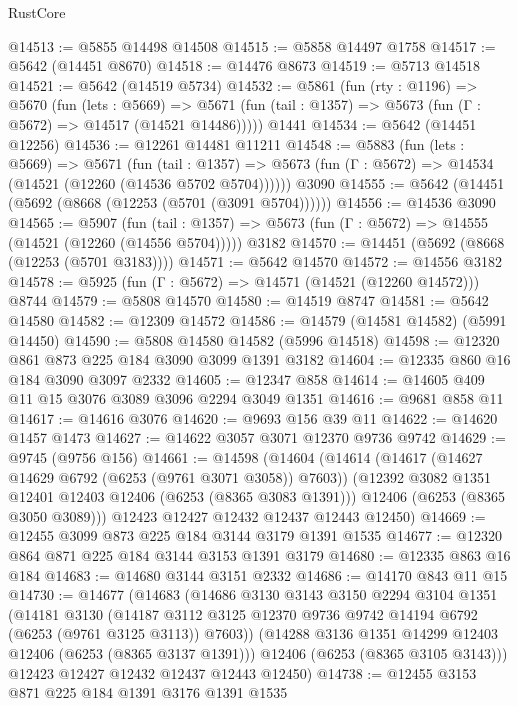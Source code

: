 \begin{lexlean}{RustCore}
\begin{coremodule}
@14513 := @5855 @14498 @14508
@14515 := @5858 @14497 @1758
@14517 := @5642 (@14451 @8670)
@14518 := @14476 @8673
@14519 := @5713 @14518
@14521 := @5642 (@14519 @5734)
@14532 := @5861
    (fun (rty : @1196) =>
    @5670
      (fun (lets : @5669) =>
      @5671 (fun (tail : @1357) => @5673 (fun (Γ : @5672) => @14517 (@14521 @14486)))))
    @1441
@14534 := @5642 (@14451 @12256)
@14536 := @12261 @14481 @11211
@14548 := @5883
    (fun (lets : @5669) =>
    @5671
      (fun (tail : @1357) =>
      @5673 (fun (Γ : @5672) => @14534 (@14521 (@12260 (@14536 @5702 @5704))))))
    @3090
@14555 := @5642 (@14451 (@5692 (@8668 (@12253 (@5701 (@3091 @5704))))))
@14556 := @14536 @3090
@14565 := @5907
    (fun (tail : @1357) => @5673 (fun (Γ : @5672) => @14555 (@14521 (@12260 (@14556 @5704)))))
    @3182
@14570 := @14451 (@5692 (@8668 (@12253 (@5701 @3183))))
@14571 := @5642 @14570
@14572 := @14556 @3182
@14578 := @5925 (fun (Γ : @5672) => @14571 (@14521 (@12260 @14572))) @8744
@14579 := @5808 @14570
@14580 := @14519 @8747
@14581 := @5642 @14580
@14582 := @12309 @14572
@14586 := @14579 (@14581 @14582) (@5991 @14450)
@14590 := @5808 @14580 @14582 (@5996 @14518)
@14598 := @12320 @861 @873 @225 @184 @3090 @3099 @1391 @3182
@14604 := @12335 @860 @16 @184 @3090 @3097 @2332
@14605 := @12347 @858
@14614 := @14605 @409 @11 @15 @3076 @3089 @3096 @2294 @3049 @1351
@14616 := @9681 @858 @11
@14617 := @14616 @3076
@14620 := @9693 @156 @39 @11
@14622 := @14620 @1457 @1473
@14627 := @14622 @3057 @3071 @12370 @9736 @9742
@14629 := @9745 (@9756 @156)
@14661 := @14598
    (@14604
      (@14614
        (@14617 (@14627 @14629 @6792 (@6253 (@9761 @3071 @3058)) @7603))
        (@12392 @3082 @1351 @12401 @12403 @12406 (@6253 (@8365 @3083 @1391)))
        @12406
        (@6253 (@8365 @3050 @3089)))
      @12423
      @12427
      @12432
      @12437
      @12443
      @12450)
@14669 := @12455 @3099 @873 @225 @184 @3144 @3179 @1391 @1535
@14677 := @12320 @864 @871 @225 @184 @3144 @3153 @1391 @3179
@14680 := @12335 @863 @16 @184
@14683 := @14680 @3144 @3151 @2332
@14686 := @14170 @843 @11 @15
@14730 := @14677
    (@14683
      (@14686
        @3130
        @3143
        @3150
        @2294
        @3104
        @1351
        (@14181
          @3130
          (@14187 @3112 @3125 @12370 @9736 @9742 @14194 @6792 (@6253 (@9761 @3125 @3113)) @7603))
        (@14288 @3136 @1351 @14299 @12403 @12406 (@6253 (@8365 @3137 @1391)))
        @12406
        (@6253 (@8365 @3105 @3143)))
      @12423
      @12427
      @12432
      @12437
      @12443
      @12450)
@14738 := @12455 @3153 @871 @225 @184 @1391 @3176 @1391 @1535

\end{coremodule}
\end{lexlean}
